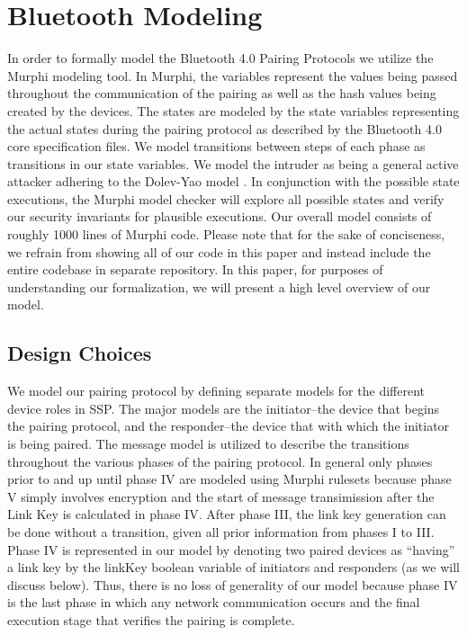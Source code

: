 \documentclass{acm_proc_article-sp}
\begin{document}
\section{Bluetooth Modeling}
In order to formally model the Bluetooth 4.0 Pairing Protocols we utilize the Murphi modeling tool. In Murphi, the variables represent the values being passed throughout the communication of the pairing as well as the hash values being created by the devices. The states are modeled by the state variables representing the actual states during the pairing protocol as described by the Bluetooth 4.0 core specification files. We model transitions between steps of each phase as transitions in our state variables. We model the intruder as being a general active attacker adhering to the Dolev-Yao model \cite{dolev:yao}. In conjunction with the possible state executions, the Murphi model checker will explore all possible states and verify our security invariants for plausible executions. Our overall model consists of roughly 1000 lines of Murphi code. Please note that for the sake of conciseness, we refrain from showing all of our code in this paper and instead include the entire codebase in separate repository. In this paper, for purposes of understanding our formalization, we will present a high level overview of our model.

\subsection{Design Choices}
We model our pairing protocol by defining separate models for the different device roles in SSP. The major models are the initiator--the device that begins the pairing protocol, and the responder--the device that with which the initiator is being paired. The message model is utilized to describe the transitions throughout the various phases of the pairing protocol. In general only phases prior to and up until phase IV are modeled using Murphi rulesets because phase V simply involves encryption and the start of message transimission after the Link Key is calculated in phase IV. After phase III, the link key generation can be done without a transition, given all prior information from phases I to III. Phase IV is represented in our model by denoting two paired devices as ``having'' a link key by the linkKey boolean variable of initiators and responders (as we will discuss below). Thus, there is no loss of generality of our model because phase IV is the last phase in which any network communication occurs and the final execution stage that verifies the pairing is complete.
\end{document}
